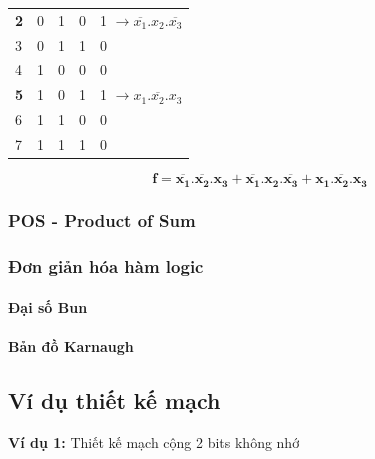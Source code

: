 \documentclass[12pt]{article}
\begin{document}
\begin{sloppypar}
\begin{table}[H]
\begin{tabular}{llll|l}
    \textbf{2}                  & 0                      & 1  & 0  & {\color[HTML]{FE0000} 1}   \(\rightarrow \overline{x_{1}}. x_{2}.\overline{x_{3}}\)                        \\
    3                           & 0                      & 1  & 1  & 0                          \\
    4                           & 1                      & 0  & 0  & 0                          \\
    \textbf{5}                  & 1                      & 0  & 1  & {\color[HTML]{FE0000} 1}   \(\rightarrow x_{1}.\overline{x_{2}}.x_{3}\)                                    \\
    6                           & 1                      & 1  & 0  & 0                          \\
    7                           & 1                      & 1  & 1  & 0                       
    \end{tabular}
    \end{table}
\[\boldsymbol{f = \overline{x_{1}}.\overline{x_{2}}.x_{3} + \overline{x_{1}}. x_{2}.\overline{x_{3}} + x_{1}.\overline{x_{2}}.x_{3} }\]

\subsubsection{POS - Product of Sum}
\subsubsection{Đơn giản hóa hàm logic}
\paragraph{Đại số Bun}
\paragraph{Bản đồ Karnaugh}
\subsection{Ví dụ thiết kế mạch}
\begin{tcolorbox}
    \textbf{Ví dụ 1:} Thiết kế mạch cộng 2 bits không nhớ 
\end{tcolorbox}


\end{sloppypar}
\end{document}
